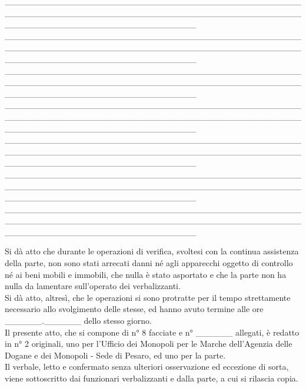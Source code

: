 \documentclass[12pt]{article}
\begin{document}
\_\_\_\_\_\_\_\_\_\_\_\_\_\_\_\_\_\_\_\_\_\_\_\_\_\_\_\_\_\_\_\_\_\_\_\_\_\_\_\_\_\_\_\_\_\_\_\_\_\_\_\_\_\_\_\_\_\_\_\_\_\_\_\_\_\_\_\_\_\_\_\_\_\_\_\_\_\_\_\_\_\_\_\_\_\_\_\_\_\_\_\_\_\_\_\_\_\_\_\_\_\_\_\_\_\_\_\_\_\_\_\_\_\_\_\_\_\_\_\_\_\_\_\_\_\_\_\\
\_\_\_\_\_\_\_\_\_\_\_\_\_\_\_\_\_\_\_\_\_\_\_\_\_\_\_\_\_\_\_\_\_\_\_\_\_\_\_\_\_\_\_\_\_\_\_\_\_\_\_\_\_\_\_\_\_\_\_\_\_\_\_\_\_\_\_\_\_\_\_\_\_\_\_\_\_\_\_\_\_\_\_\_\_\_\_\_\_\_\_\_\_\_\_\_\_\_\_\_\_\_\_\_\_\_\_\_\_\_\_\_\_\_\_\_\_\_\_\_\_\_\_\_\_\_\_\\
\_\_\_\_\_\_\_\_\_\_\_\_\_\_\_\_\_\_\_\_\_\_\_\_\_\_\_\_\_\_\_\_\_\_\_\_\_\_\_\_\_\_\_\_\_\_\_\_\_\_\_\_\_\_\_\_\_\_\_\_\_\_\_\_\_\_\_\_\_\_\_\_\_\_\_\_\_\_\_\_\_\_\_\_\_\_\_\_\_\_\_\_\_\_\_\_\_\_\_\_\_\_\_\_\_\_\_\_\_\_\_\_\_\_\_\_\_\_\_\_\_\_\_\_\_\_\_\\
\_\_\_\_\_\_\_\_\_\_\_\_\_\_\_\_\_\_\_\_\_\_\_\_\_\_\_\_\_\_\_\_\_\_\_\_\_\_\_\_\_\_\_\_\_\_\_\_\_\_\_\_\_\_\_\_\_\_\_\_\_\_\_\_\_\_\_\_\_\_\_\_\_\_\_\_\_\_\_\_\_\_\_\_\_\_\_\_\_\_\_\_\_\_\_\_\_\_\_\_\_\_\_\_\_\_\_\_\_\_\_\_\_\_\_\_\_\_\_\_\_\_\_\_\_\_\_\\
\_\_\_\_\_\_\_\_\_\_\_\_\_\_\_\_\_\_\_\_\_\_\_\_\_\_\_\_\_\_\_\_\_\_\_\_\_\_\_\_\_\_\_\_\_\_\_\_\_\_\_\_\_\_\_\_\_\_\_\_\_\_\_\_\_\_\_\_\_\_\_\_\_\_\_\_\_\_\_\_\_\_\_\_\_\_\_\_\_\_\_\_\_\_\_\_\_\_\_\_\_\_\_\_\_\_\_\_\_\_\_\_\_\_\_\_\_\_\_\_\_\_\_\_\_\_\_\\
\_\_\_\_\_\_\_\_\_\_\_\_\_\_\_\_\_\_\_\_\_\_\_\_\_\_\_\_\_\_\_\_\_\_\_\_\_\_\_\_\_\_\_\_\_\_\_\_\_\_\_\_\_\_\_\_\_\_\_\_\_\_\_\_\_\_\_\_\_\_\_\_\_\_\_\_\_\_\_\_\_\_\_\_\_\_\_\_\_\_\_\_\_\_\_\_\_\_\_\_\_\_\_\_\_\_\_\_\_\_\_\_\_\_\_\_\_\_\_\_\_\_\_\_\_\_\_\\
\_\_\_\_\_\_\_\_\_\_\_\_\_\_\_\_\_\_\_\_\_\_\_\_\_\_\_\_\_\_\_\_\_\_\_\_\_\_\_\_\_\_\_\_\_\_\_\_\_\_\_\_\_\_\_\_\_\_\_\_\_\_\_\_\_\_\_\_\_\_\_\_\_\_\_\_\_\_\_\_\_\_\_\_\_\_\_\_\_\_\_\_\_\_\_\_\_\_\_\_\_\_\_\_\_\_\_\_\_\_\_\_\_\_\_\_\_\_\_\_\_\_\_\_\_\_\_

\newpage

Si dà atto che durante le operazioni di verifica, svoltesi con la continua assistenza della parte, non sono stati arrecati danni né agli apparecchi oggetto di controllo né ai beni mobili e immobili, che nulla è stato asportato e che la parte non ha nulla da lamentare sull’operato dei verbalizzanti.\\
Si dà atto, altresì, che le operazioni si sono protratte per il tempo strettamente necessario allo svolgimento delle stesse, ed hanno avuto termine alle ore \_\_\_\_\_\_.\_\_\_\_\_\_ dello stesso giorno.\\
Il presente atto, che si compone di n° 8 facciate e n° \_\_\_\_\_\_ allegati, è redatto in n° 2 originali, uno per l’Ufficio dei Monopoli per le Marche dell’Agenzia delle Dogane e dei Monopoli - Sede di Pesaro, ed uno per la parte.\\
Il verbale, letto e confermato senza ulteriori osservazione ed eccezione di sorta, viene sottoscritto dai funzionari verbalizzanti e dalla parte, a cui si rilascia copia.
\end{document}
